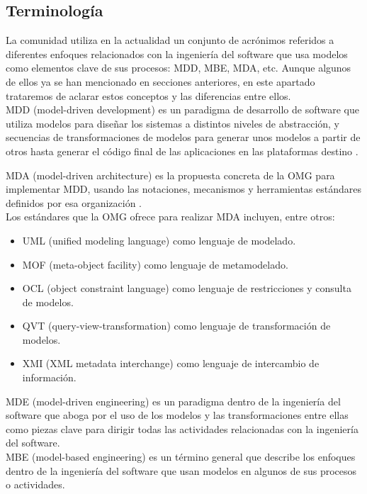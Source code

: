 \subsection{Terminología}
\label{Terminología}

La comunidad utiliza en la actualidad un conjunto de acrónimos referidos a diferentes enfoques relacionados con la ingeniería del software que usa modelos como elementos clave de sus procesos: MDD, MBE, MDA, etc. Aunque algunos de ellos ya se han mencionado en secciones anteriores, en este apartado trataremos de aclarar estos conceptos y las diferencias entre ellos.\\

MDD (model-driven development) es un paradigma de desarrollo de software que utiliza modelos para diseñar los sistemas a distintos niveles de abstracción, y secuencias de transformaciones de modelos para generar unos modelos a partir de otros hasta generar el código final de las aplicaciones en las plataformas destino \cite{3}.

MDA (model-driven architecture) es la propuesta concreta de la OMG para implementar MDD, usando las notaciones, mecanismos y herramientas estándares definidos por esa organización \cite{5}.\\

Los estándares que la OMG ofrece para realizar MDA incluyen, entre otros:

\begin{itemize}
	\item UML (unified modeling language) como lenguaje de modelado.
	\item MOF (meta-object facility) como lenguaje de metamodelado.
	\item OCL (object constraint language) como lenguaje de restricciones y consulta de modelos.
	\item QVT (query-view-transformation) como lenguaje de transformación de modelos.
	\item XMI (XML metadata interchange) como lenguaje de intercambio de información.
\end{itemize}

MDE (model-driven engineering) es un paradigma dentro de la ingeniería del software que aboga por el uso de los modelos y las transformaciones entre ellas como piezas clave para dirigir todas las actividades relacionadas con la ingeniería del software.\\

MBE (model-based engineering) es un término general que describe los enfoques dentro de la ingeniería del software que usan modelos en algunos de sus procesos o actividades.\\

